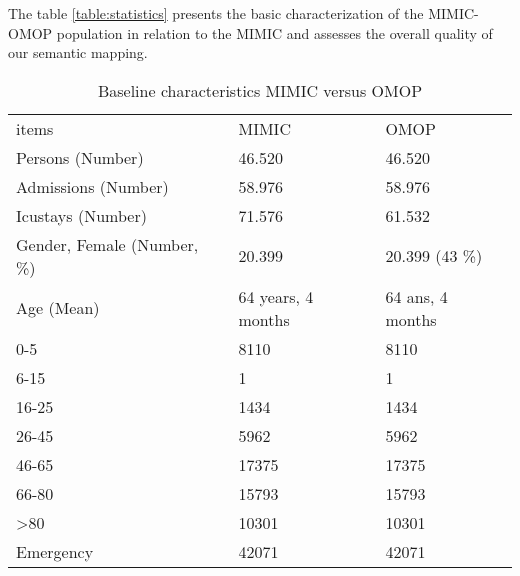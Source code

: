  

                                                                   
The table \ref{table:statistics} presents the basic characterization of the 
MIMIC-OMOP population in relation to the MIMIC and assesses the overall quality of 
our semantic mapping.

\begin{table*}[t]
\caption{Baseline characteristics MIMIC versus OMOP}
\begin{tabular}{@{}lll@{}}\toprule
items                                  & MIMIC                       & OMOP                               \\\colrule
Persons (Number)                       & 46.520                      & 46.520                             \\
Admissions (Number)                    & 58.976                      & 58.976                             \\
Icustays (Number)                      & 71.576                      & 61.532                             \\
Gender, Female (Number, \%)            & 20.399                      & 20.399 (43 \%)                     \\
Age (Mean)                             & 64 years, 4 months          & 64 ans, 4 months                   \\
0-5                                    & 8110                        & 8110                               \\
6-15                                   & 1                           & 1                                  \\
16-25                                  & 1434                        & 1434                               \\
26-45                                  & 5962                        & 5962                               \\
46-65                                  & 17375                       & 17375                              \\
66-80                                  & 15793                       & 15793                              \\
\textgreater{}80                       & 10301                       & 10301                              \\
Emergency                              & 42071                       & 42071                              \\

\end{tabular}
\end{table*}
